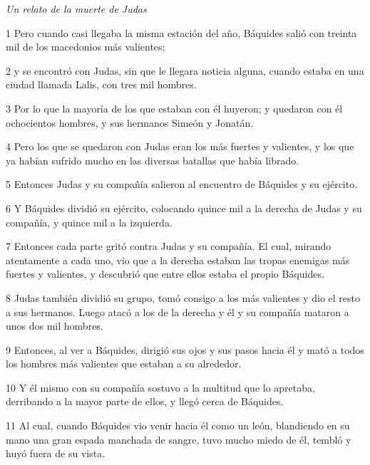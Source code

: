 \par \textit{Un relato de la muerte de Judas}

\par 1 Pero cuando casi llegaba la misma estación del año, Báquides salió con treinta mil de los macedonios más valientes;

\par 2 y se encontró con Judas, sin que le llegara noticia alguna, cuando estaba en una ciudad llamada Lalis, con tres mil hombres.

\par 3 Por lo que la mayoría de los que estaban con él huyeron; y quedaron con él ochocientos hombres, y sus hermanos Simeón y Jonatán.

\par 4 Pero los que se quedaron con Judas eran los más fuertes y valientes, y los que ya habían sufrido mucho en las diversas batallas que había librado.

\par 5 Entonces Judas y su compañía salieron al encuentro de Báquides y su ejército.

\par 6 Y Báquides dividió su ejército, colocando quince mil a la derecha de Judas y su compañía, y quince mil a la izquierda.

\par 7 Entonces cada parte gritó contra Judas y su compañía. El cual, mirando atentamente a cada uno, vio que a la derecha estaban las tropas enemigas más fuertes y valientes, y descubrió que entre ellos estaba el propio Báquides.

\par 8 Judas también dividió su grupo, tomó consigo a los más valientes y dio el resto a sus hermanos. Luego atacó a los de la derecha y él y su compañía mataron a unos dos mil hombres.

\par 9 Entonces, al ver a Báquides, dirigió sus ojos y sus pasos hacia él y mató a todos los hombres más valientes que estaban a su alrededor.

\par 10 Y él mismo con su compañía sostuvo a la multitud que lo apretaba, derribando a la mayor parte de ellos, y llegó cerca de Báquides.

\par 11 Al cual, cuando Báquides vio venir hacia él como un león, blandiendo en su mano una gran espada manchada de sangre, tuvo mucho miedo de él, tembló y huyó fuera de su vista.

